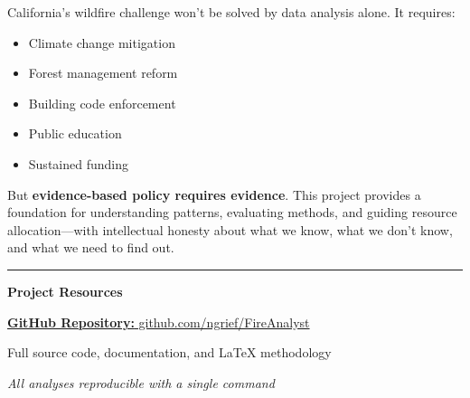 \documentclass[11pt,a4paper]{article}
\begin{document}
California's wildfire challenge won't be solved by data analysis alone. It requires:
\begin{itemize}
    \item Climate change mitigation
    \item Forest management reform
    \item Building code enforcement
    \item Public education
    \item Sustained funding
\end{itemize}

But \textbf{evidence-based policy requires evidence}. This project provides a foundation for understanding patterns, evaluating methods, and guiding resource allocation---with intellectual honesty about what we know, what we don't know, and what we need to find out.

\vspace{0.5cm}

\begin{center}
\rule{0.8\textwidth}{0.4pt}

\textbf{Project Resources}

\vspace{0.2cm}

\href{https://github.com/ngrief/FireAnalyst}{\textbf{GitHub Repository:} github.com/ngrief/FireAnalyst}

Full source code, documentation, and LaTeX methodology

\vspace{0.2cm}

\textit{All analyses reproducible with a single command}
\end{center}
\end{document}
